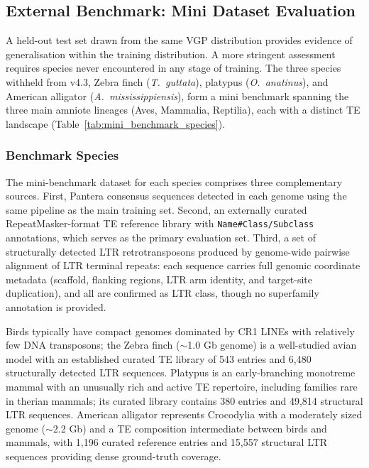 \documentclass[12pt]{article}
\begin{document}
\fi

\subsection{External Benchmark: Mini Dataset Evaluation}\label{ssec:mini_benchmark}

A held-out test set drawn from the same VGP distribution provides evidence of generalisation within the training distribution. A more stringent assessment requires species never encountered in any stage of training. The three species withheld from v4.3, Zebra finch (\textit{T.~guttata}), platypus (\textit{O.~anatinus}), and American alligator (\textit{A.~mississippiensis}), form a mini benchmark spanning the three main amniote lineages (Aves, Mammalia, Reptilia), each with a distinct TE landscape (Table~\ref{tab:mini_benchmark_species}).

\subsubsection{Benchmark Species}

The mini-benchmark dataset for each species comprises three complementary sources. First, Pantera consensus sequences detected in each genome using the same pipeline as the main training set. Second, an externally curated RepeatMasker-format TE reference library with \texttt{Name\#Class/Subclass} annotations, which serves as the primary evaluation set. Third, a set of structurally detected LTR retrotransposons produced by genome-wide pairwise alignment of LTR terminal repeats: each sequence carries full genomic coordinate metadata (scaffold, flanking regions, LTR arm identity, and target-site duplication), and all are confirmed as LTR class, though no superfamily annotation is provided.

Birds typically have compact genomes dominated by CR1 LINEs with relatively few DNA transposons; the Zebra finch ($\sim$1.0 Gb genome) is a well-studied avian model with an established curated TE library of 543 entries and 6{,}480 structurally detected LTR sequences. Platypus is an early-branching monotreme mammal with an unusually rich and active TE repertoire, including families rare in therian mammals; its curated library contains 380 entries and 49{,}814 structural LTR sequences. American alligator represents Crocodylia with a moderately sized genome ($\sim$2.2 Gb) and a TE composition intermediate between birds and mammals, with 1{,}196 curated reference entries and 15{,}557 structural LTR sequences providing dense ground-truth coverage.
\end{document}
